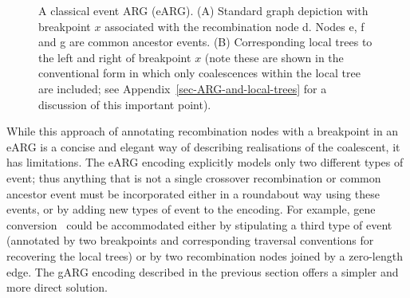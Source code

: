 \documentclass{article}
\newcommand{\noderef}[1]{\textsf{#1}}
\begin{document}
\begin{figure}
\caption{\label{fig-event-arg}
A classical event ARG (eARG). (A) Standard graph depiction with
breakpoint $x$ associated with the recombination node \noderef{d}.
Nodes \noderef{e}, \noderef{f} and \noderef{g} are common ancestor events.
(B) Corresponding local trees to the left and right of breakpoint $x$
(note these are shown in the conventional form in which only coalescences
within the local tree are included; see Appendix~\ref{sec-ARG-and-local-trees}
for a discussion of this important point).
}
\end{figure}

While this approach of annotating recombination nodes with a
breakpoint in an eARG is a concise and elegant way of describing realisations
of the coalescent, it has limitations.
The eARG encoding explicitly models only
two different types of event; thus anything that is not a single crossover
recombination or common ancestor event must be incorporated
either in a roundabout way using these
events, or by adding new types of event to the encoding. For example, gene
conversion~\citep{wiuf2000coalescent} could 
be accommodated either by stipulating a third type of event
(annotated by two breakpoints and corresponding traversal conventions for
recovering the local trees) or by two recombination nodes joined by a
zero-length edge. The gARG encoding described in the previous
section offers a simpler and more direct solution.
\end{document}
